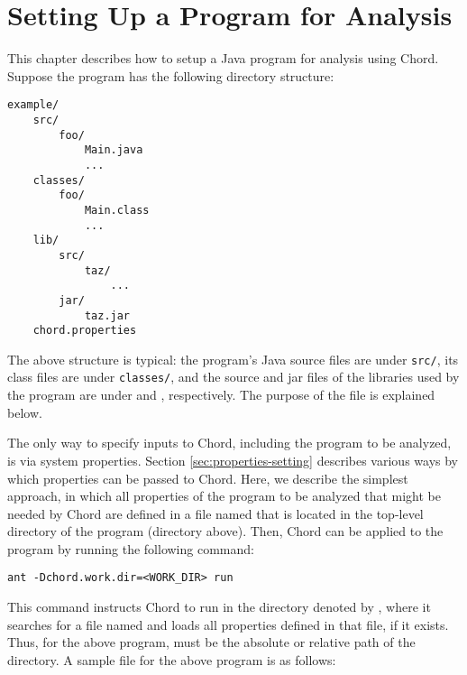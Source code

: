 \chapter{Setting Up a Program for Analysis}
\label{chap:program-setup}

This chapter describes how to setup a Java program for analysis using Chord.
Suppose the program has the following directory structure:

\begin{framed}
\begin{verbatim}
example/
    src/
        foo/
            Main.java
            ...
    classes/
        foo/
            Main.class
            ...
    lib/
        src/
            taz/
                ...
        jar/
            taz.jar
    chord.properties
\end{verbatim}
\end{framed}

The above structure is typical: the program's Java source
files are under {\tt src/}, its class files are under {\tt classes/},
and the source and jar files of the libraries used by the program are
under  and , respectively.  The
purpose of the  file is explained below.

The only way to specify inputs to Chord, including the program
to be analyzed, is via system properties.
Section \ref{sec:properties-setting} describes various ways by which
properties can be passed to Chord.  Here, we describe the
simplest approach, in which all properties of the program to be analyzed
that might be needed by Chord are defined in a file named  
that is located in the top-level directory of the program (directory  above).
Then, Chord can be applied to the program by running the following command:

\begin{framed}
\begin{verbatim}
ant -Dchord.work.dir=<WORK_DIR> run
\end{verbatim}
\end{framed}

This command instructs Chord to run in the directory denoted by , where it searches for a file
named  and
loads all properties defined in that file, if it exists.
Thus, for the above program,  must be the absolute or relative path of the
 directory.  A sample  file for the above program is as follows:

